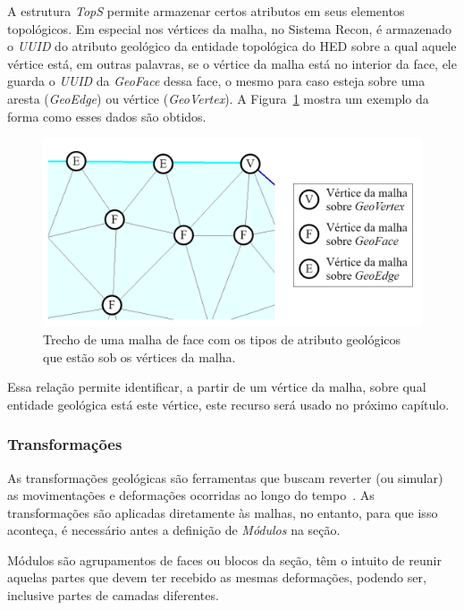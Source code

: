 A estrutura \textit{TopS} permite armazenar certos atributos em seus elementos topológicos. Em especial nos vértices da malha, no Sistema Recon, é armazenado o \textit{UUID} do atributo geológico da entidade topológica do HED sobre a qual aquele vértice está, em outras palavras, se o vértice da malha está no interior da face, ele guarda o \textit{UUID} da \textit{GeoFace} dessa face, o mesmo para caso esteja sobre uma aresta (\textit{GeoEdge}) ou vértice (\textit{GeoVertex}). A Figura~\ref{fig-recon-4} mostra um exemplo da forma como esses dados são obtidos.

\begin{figure} [H]
  \begin{center}
    \includegraphics[width=\textwidth]{images/fig-recon-4}
    \caption{Trecho de uma malha de face com os tipos de atributo geológicos que estão sob os vértices da malha.}\label{fig-recon-4}
  \end{center}
\end{figure}

Essa relação permite identificar, a partir de um vértice da malha, sobre qual entidade geológica está este vértice, este recurso será usado no próximo capítulo.

\subsubsection{Transformações}

As transformações geológicas são ferramentas que buscam reverter (ou simular) as movimentações e deformações ocorridas ao longo do tempo~\cite{Santi}. As transformações são aplicadas diretamente às malhas, no entanto, para que isso aconteça, é necessário antes a definição de \textit{Módulos} na seção. 

Módulos são agrupamentos de faces ou blocos da seção, têm o intuito de reunir aquelas partes que devem ter recebido as mesmas deformações, podendo ser, inclusive partes de camadas diferentes.

